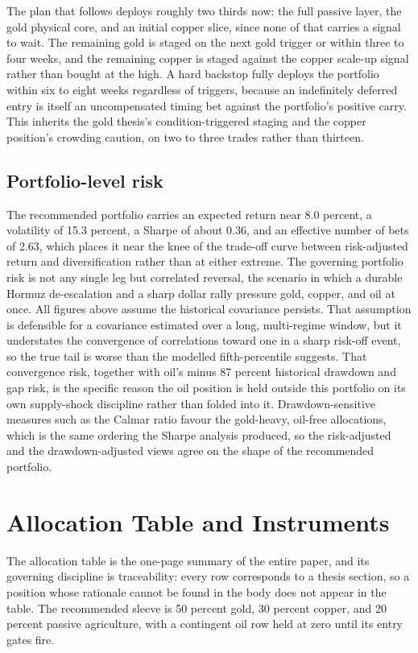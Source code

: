 \documentclass[11pt,a4paper]{article}
\begin{document}
The plan that follows deploys roughly two thirds now: the full passive layer, the gold physical core, and an initial copper slice, since none of that carries a signal to wait. The remaining gold is staged on the next gold trigger or within three to four weeks, and the remaining copper is staged against the copper scale-up signal rather than bought at the high. A hard backstop fully deploys the portfolio within six to eight weeks regardless of triggers, because an indefinitely deferred entry is itself an uncompensated timing bet against the portfolio's positive carry. This inherits the gold thesis's condition-triggered staging and the copper position's crowding caution, on two to three trades rather than thirteen.

\subsection{Portfolio-level risk}

The recommended portfolio carries an expected return near 8.0 percent, a volatility of 15.3 percent, a Sharpe of about 0.36, and an effective number of bets of 2.63, which places it near the knee of the trade-off curve between risk-adjusted return and diversification rather than at either extreme. The governing portfolio risk is not any single leg but correlated reversal, the scenario in which a durable Hormuz de-escalation and a sharp dollar rally pressure gold, copper, and oil at once. All figures above assume the historical covariance persists. That assumption is defensible for a covariance estimated over a long, multi-regime window, but it understates the convergence of correlations toward one in a sharp risk-off event, so the true tail is worse than the modelled fifth-percentile suggests. That convergence risk, together with oil's minus 87 percent historical drawdown and gap risk, is the specific reason the oil position is held outside this portfolio on its own supply-shock discipline rather than folded into it. Drawdown-sensitive measures such as the Calmar ratio favour the gold-heavy, oil-free allocations, which is the same ordering the Sharpe analysis produced, so the risk-adjusted and the drawdown-adjusted views agree on the shape of the recommended portfolio.

\clearpage
\section{Allocation Table and Instruments}

The allocation table is the one-page summary of the entire paper, and its governing discipline is traceability: every row corresponds to a thesis section, so a position whose rationale cannot be found in the body does not appear in the table. The recommended sleeve is 50 percent gold, 30 percent copper, and 20 percent passive agriculture, with a contingent oil row held at zero until its entry gates fire.
\end{document}
